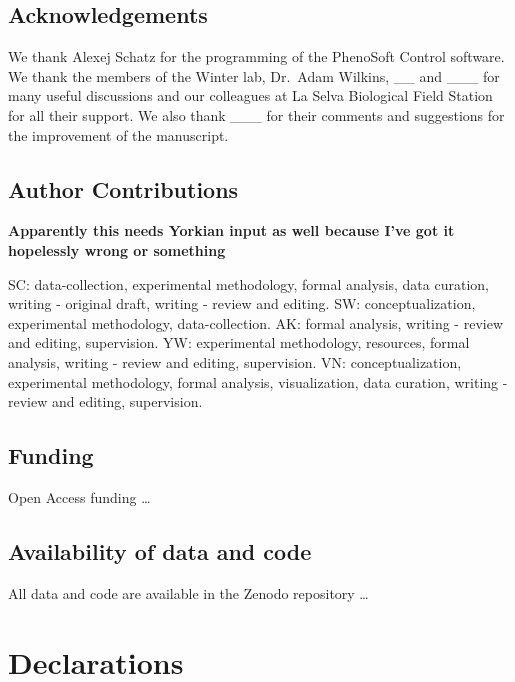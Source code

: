 \documentclass[
]{article}
\begin{document}
\hypertarget{acknowledgements}{%
\subsection{Acknowledgements}\label{acknowledgements}}

We thank Alexej Schatz for the programming of the PhenoSoft Control software. We thank the members of the Winter lab, Dr.~Adam Wilkins, \_\_ and \_\_\_ for many useful discussions and our colleagues at La Selva Biological Field Station for all their support. We also thank \_\_\_ for their comments and suggestions for the improvement of the manuscript.

\hypertarget{author-contributions}{%
\subsection{Author Contributions}\label{author-contributions}}

\textbf{Apparently this needs Yorkian input as well because I've got it hopelessly wrong or something}

SC: data-collection, experimental methodology, formal analysis, data curation, writing - original draft, writing - review and editing. SW: conceptualization, experimental methodology, data-collection. AK: formal analysis, writing - review and editing, supervision. YW: experimental methodology, resources, formal analysis, writing - review and editing, supervision. VN: conceptualization, experimental methodology, formal analysis, visualization, data curation, writing - review and editing, supervision.

\hypertarget{funding}{%
\subsection{Funding}\label{funding}}

Open Access funding \ldots{}

\hypertarget{availability-of-data-and-code}{%
\subsection{Availability of data and code}\label{availability-of-data-and-code}}

All data and code are available in the Zenodo repository \ldots{}

\hypertarget{declarations}{%
\section{Declarations}\label{declarations}}
\end{document}
